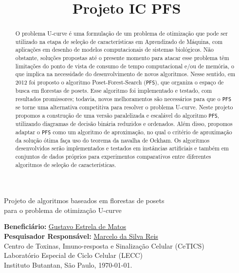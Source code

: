 \documentclass[12pt]{article}
\title{Projeto IC PFS}
\begin{document}
%
\doublespacing

\thispagestyle{empty} 
\begin{flushright}
    {\LARGE Projeto de algoritmos baseados em florestas de posets\\
        \bigskip 
        para o problema de otimização U-curve}

  \bigskip
  \bigskip
        
  {\large {\bf Beneficiário:} \href{mailto:gustavo.estrela.matos@usp.br}{Gustavo Estrela de Matos}\\ 
  {\bf Pesquisador Responsável:} \href{mailto:marcelo.reis@butantan.gov.br}{Marcelo da Silva Reis}\\
  \bigskip
Centro de Toxinas, Imuno-resposta e Sinalização Celular (CeTICS)\\
Laboratório Especial de Ciclo Celular (LECC)\\
  Instituto Butantan, São Paulo, \today.\\
  }

  \bigskip
  \bigskip
\end{flushright}
\begin{abstract}
O problema U-curve é uma formulação de um problema de otimização que pode ser utilizado na etapa de seleção de características em Aprendizado de Máquina, com aplicações em desenho de modelos computacionais de sistemas biológicos. Não obstante, soluções propostas até o presente momento para atacar esse problema têm limitações do ponto de vista de consumo de tempo computacional e/ou de memória, o que implica na necessidade do desenvolvimento de novos algoritmos. Nesse sentido, em 2012 foi proposto o algoritmo Poset-Forest-Search ({\tt PFS}), que organiza o espaço de busca em florestas de posets. Esse algoritmo foi implementado e testado, com resultados promissores; todavia, novos melhoramentos são necessários para que o {\tt PFS} se torne uma alternativa competitiva para resolver o problema U-curve. Neste projeto propomos a construção de uma versão paralelizada e escalável do algoritmo {\tt PFS}, utilizando diagramas de decisão binária reduzidos e ordenados. Além disso, propomos adaptar o {\tt PFS} como um algoritmo de aproximação, no qual o critério de aproximação da solução ótima faça uso do teorema da navalha de Ockham. Os algoritmos desenvolvidos serão implementados e testados em instâncias artificiais e também em conjuntos de dados próprios para experimentos comparativos entre diferentes algoritmos de seleção de características.
\end{abstract}
\end{document}
